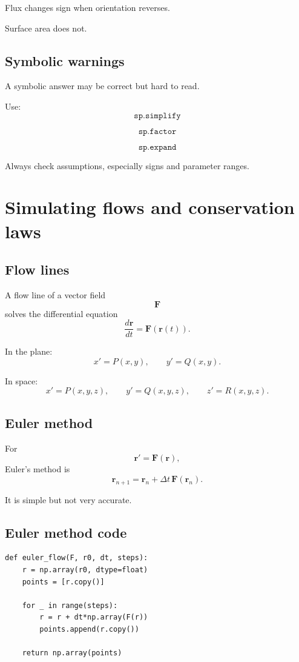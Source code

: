 Flux changes sign when orientation reverses.

Surface area does not.

\subsection*{Symbolic warnings}

A symbolic answer may be correct but hard to read.

Use:
\[
\boxed{
    \texttt{sp.simplify}
}
\]

\[
\boxed{
    \texttt{sp.factor}
}
\]

\[
\boxed{
    \texttt{sp.expand}
}
\]

Always check assumptions, especially signs and parameter ranges.

\section{Simulating flows and conservation laws}
\label{app:G.6}

\subsection*{Flow lines}

A flow line of a vector field
\[
    \mathbf F
\]
solves the differential equation
\[
\boxed{
    \frac{d\mathbf r}{dt}=\mathbf F(\mathbf r(t)).
}
\]

In the plane:
\[
\boxed{
    x'=P(x,y),
    \qquad
    y'=Q(x,y).
}
\]

In space:
\[
\boxed{
    x'=P(x,y,z),
    \qquad
    y'=Q(x,y,z),
    \qquad
    z'=R(x,y,z).
}
\]

\subsection*{Euler method}

For
\[
    \mathbf r'=\mathbf F(\mathbf r),
\]
Euler's method is
\[
\boxed{
    \mathbf r_{n+1}
    =
    \mathbf r_n+\Delta t\,\mathbf F(\mathbf r_n).
}
\]

It is simple but not very accurate.

\subsection*{Euler method code}

\begin{verbatim}
def euler_flow(F, r0, dt, steps):
    r = np.array(r0, dtype=float)
    points = [r.copy()]

    for _ in range(steps):
        r = r + dt*np.array(F(r))
        points.append(r.copy())

    return np.array(points)
\end{verbatim}

